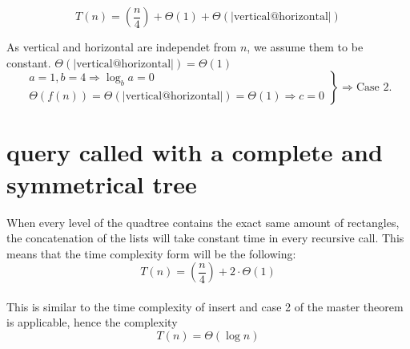 \documentclass[12pt, a4paper]{article}
\begin{document}
$$T(n)=\left(\frac{n}{4}\right)+\Theta(1)+\Theta(|\text{vertical@horizontal}|)$$

As vertical and horizontal are independet from $n$, we assume them to be constant. $\Theta(|\text{vertical@horizontal}|) = \Theta(1)$\\

\[
\left.
\begin{array}{l}
  a=1, b=4 \Rightarrow \log_ba = 0 \\
  \Theta(f(n)) = \Theta(|\text{vertical@horizontal}|) = \Theta(1) \Rightarrow c = 0
\end{array} \right\} \Rightarrow \text{Case 2.}
\]

\section{query called with a complete and symmetrical tree}

When every level of the quadtree contains the exact same amount of rectangles, the concatenation of the lists will take constant time in every recursive call. This means that the time complexity form will be the following: $$T(n)=\left(\frac{n}{4}\right)+2\cdot\Theta(1)$$\\

This is similar to the time complexity of insert and case 2 of the master theorem is applicable, hence the complexity $$T(n)=\Theta(\log n)$$
\end{document}
